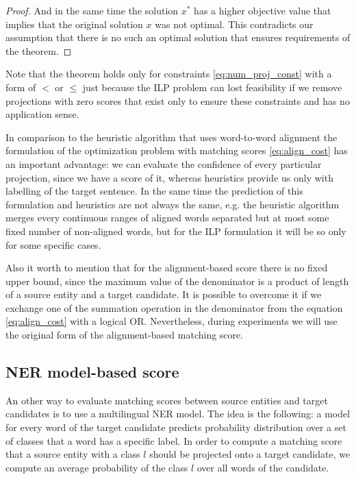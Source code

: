 \begin{proof}
  And in the same time the solution \( x^* \) has a higher objective value that implies that the original solution \( x \) was not optimal.
  This contradicts our assumption that there is no such an optimal solution that ensures requirements of the theorem.
\end{proof}
Note that the theorem holds only for constraints \eqref{eq:num_proj_const} with a form of \( < \) or
\( \leq \) just because the ILP problem can lost feasibility if we remove projections with zero scores that
exist only to ensure these constraints and has no application sense.

In comparison to the heuristic algorithm that uses word-to-word alignment the formulation of the optimization
problem with matching scores \eqref{eq:align_cost} has an important advantage: we can evaluate the confidence of
every particular projection, since we have a score of it, whereas heuristics provide us only with labelling of the target
sentence. In the same time the prediction of this formulation and heuristics are not always the same, e.g.
the heuristic algorithm merges every continuous ranges of aligned words separated but at most some fixed number of non-aligned words,
but for the ILP formulation it will be so only for some specific cases.

Also it worth to mention that for the alignment-based score there is no fixed upper bound, since
the maximum value of the denominator is a product of length of a source entity and a target candidate.
It is possible to overcome it if we exchange one of the summation operation in the denominator from the
equation \eqref{eq:align_cost} with a logical OR. Nevertheless, during experiments we will use the
original form of the alignment-based matching score.

\subsection{NER model-based score}

An other way to evaluate matching scores between source entities and target candidates is to
use a multilingual NER model. The idea is the following: a model for every word of the target candidate
predicts probability distribution over a set of classes that a word has a specific label. In order to compute
a matching score that a source entity with a class \( l \) should be projected onto a target candidate,
we compute an average probability of the class \( l \) over all words of the candidate.


